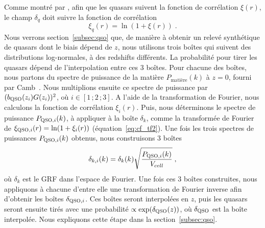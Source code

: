 Comme montré par \textcite{coles_lognormal_1991}, afin que les quasars suivent la fonction de corrélation $\xi(r)$, le champ $\delta_q$ doit suivre la fonction de corrélation 
\begin{equation}
  \label{eq:lognormal}
  \xi_q(r) = \ln(1+\xi(r)) \; .
\end{equation}
Nous verrons section~\ref{subsec:qso} que, de manière à obtenir un relevé synthétique de quasars dont le biais dépend de $z$, nous utilisons trois boîtes qui suivent des distributions log-normales, à des redshifts différents. La probabilité pour tirer les quasars dépend de l'interpolation entre ces 3 boîtes.
Pour chacune des boîtes, nous partons du spectre de puissance de la matière $P_{\mathrm{matière}}(k)$ à $z=0$, fourni par Camb~\autocite{Lewis1999}. Nous multiplions ensuite ce spectre de puissance par $(b_{\textsc{QSO}}(z_i) G(z_i))^2$, où $i \in [1\, ; 2\, ; 3]$. A l'aide de la transformation de Fourier, nous calculons la fonction de corrélation $\xi_{i}(r)$. Puis, nous déterminons le spectre de puissance $P_{\textsc{QSO},i}(k)$, à appliquer à la boîte $\delta_k$, comme la transformée de Fourier de $\xi_{\textsc{QSO},i}(r) = \ln(1+\xi_i(r))$ (équation~\ref{eq:cf_tf2}).
Une fois les trois spectres de puissances $P_{\textsc{QSO},i}(k)$ obtenus, nous construisons 3 boîtes
\begin{equation}
  \delta_{k,i}(k)  = \delta_k(k) \sqrt{\frac{P_{\textsc{QSO},i}(k)}{V_{cell}}} \; ,
\end{equation}
où $\delta_k$ est le GRF dans l'espace de Fourier. Une fois ces 3 boîtes construites, nous appliquons à chacune d'entre elle une transformation de Fourier inverse afin d'obtenir les boîtes $\delta_{\textsc{QSO}, i}$. Ces boîtes seront interpolées en $z$, puis les quasars seront ensuite tirés avec une probabilité $\propto \exp(\delta_{\textsc{QSO}}(z))$, où $\delta_{\textsc{QSO}}$ est la boîte interpolée. Nous expliquons cette étape dans la section~\ref{subsec:qso}.


